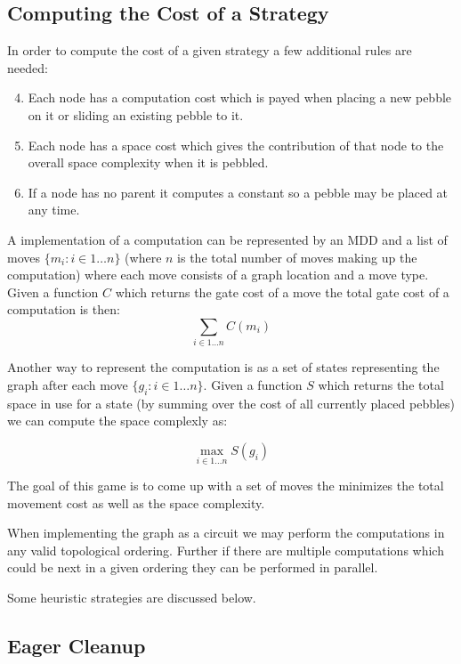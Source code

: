 \subsection{Computing the Cost of a Strategy}

In order to compute the cost of a given strategy a few additional rules are
needed:

\begin{enumerate}
    \setcounter{enumi}{3}
  \item Each node has a computation cost which is payed when placing a new pebble on
    it or sliding an existing pebble to it.
  \item Each node has a space cost which gives the contribution of that node to
    the overall space complexity when it is pebbled.
  \item If a node has no parent it computes a constant so a pebble may be placed
    at any time.
\end{enumerate}

A implementation of a computation can be represented by an MDD and a list of
moves $\{m_i:i \in 1 \dotsc n\}$ (where $n$ is the total number of moves making up the
computation) where each move consists of a graph location and a move type. Given
a function $C$ which returns the gate cost of a move the total gate cost of a
computation is then:
\[ \sum_{i\in 1 \dotsc n} C(m_i) \]

Another way to represent the computation is as a set of states representing the
graph after each move $\{g_i:i \in 1 \dotsc n\}$. Given a function $S$ which
returns the total space in use for a state (by summing over the cost of all
currently placed pebbles) we can compute the space complexly as:

\[ \max_{i\in 1 \dotsc n} S(g_i) \]

The goal of this game is to come up with a set of moves the minimizes the total
movement cost as well as the space complexity.

When implementing the graph as a circuit we may perform the computations in any
valid topological ordering. Further if there are multiple computations which
could be next in a given ordering they can be performed in parallel.

Some heuristic strategies are discussed below.

\subsection{Eager Cleanup}

